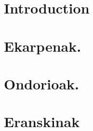 \documentclass[12pt,a4paper]{basque-book}
\renewcommand{\=}{"-}
\begin{document}
\part{Introduction}

 



%

\part{Ekarpenak.}




\part{Ondorioak.}





\part{Eranskinak}
\appendix

   
%  


%



\backmatter
\nocite{*}



\printindex
\end{document}
